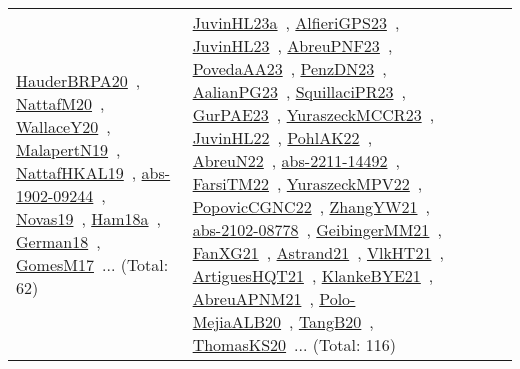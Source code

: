 {\begin{longtable}{lp{3cm}>{\raggedright\arraybackslash}p{6cm}>{\raggedright\arraybackslash}p{6cm}>{\raggedright\arraybackslash}p{8cm}}
\href{../works/HauderBRPA20.pdf}{HauderBRPA20}~\cite{HauderBRPA20}, \href{../works/NattafM20.pdf}{NattafM20}~\cite{NattafM20}, \href{../works/WallaceY20.pdf}{WallaceY20}~\cite{WallaceY20}, \href{../works/MalapertN19.pdf}{MalapertN19}~\cite{MalapertN19}, \href{../works/NattafHKAL19.pdf}{NattafHKAL19}~\cite{NattafHKAL19}, \href{../works/abs-1902-09244.pdf}{abs-1902-09244}~\cite{abs-1902-09244}, \href{../works/Novas19.pdf}{Novas19}~\cite{Novas19}, \href{../works/Ham18a.pdf}{Ham18a}~\cite{Ham18a}, \href{../works/German18.pdf}{German18}~\cite{German18}, \href{../works/GomesM17.pdf}{GomesM17}~\cite{GomesM17}... (Total: 62) & \href{../works/JuvinHL23a.pdf}{JuvinHL23a}~\cite{JuvinHL23a}, \href{../works/AlfieriGPS23.pdf}{AlfieriGPS23}~\cite{AlfieriGPS23}, \href{../works/JuvinHL23.pdf}{JuvinHL23}~\cite{JuvinHL23}, \href{../works/AbreuPNF23.pdf}{AbreuPNF23}~\cite{AbreuPNF23}, \href{../works/PovedaAA23.pdf}{PovedaAA23}~\cite{PovedaAA23}, \href{../works/PenzDN23.pdf}{PenzDN23}~\cite{PenzDN23}, \href{../works/AalianPG23.pdf}{AalianPG23}~\cite{AalianPG23}, \href{../works/SquillaciPR23.pdf}{SquillaciPR23}~\cite{SquillaciPR23}, \href{../works/GurPAE23.pdf}{GurPAE23}~\cite{GurPAE23}, \href{../works/YuraszeckMCCR23.pdf}{YuraszeckMCCR23}~\cite{YuraszeckMCCR23}, \href{../works/JuvinHL22.pdf}{JuvinHL22}~\cite{JuvinHL22}, \href{../works/PohlAK22.pdf}{PohlAK22}~\cite{PohlAK22}, \href{../works/AbreuN22.pdf}{AbreuN22}~\cite{AbreuN22}, \href{../works/abs-2211-14492.pdf}{abs-2211-14492}~\cite{abs-2211-14492}, \href{../works/FarsiTM22.pdf}{FarsiTM22}~\cite{FarsiTM22}, \href{../works/YuraszeckMPV22.pdf}{YuraszeckMPV22}~\cite{YuraszeckMPV22}, \href{../works/PopovicCGNC22.pdf}{PopovicCGNC22}~\cite{PopovicCGNC22}, \href{../works/ZhangYW21.pdf}{ZhangYW21}~\cite{ZhangYW21}, \href{../works/abs-2102-08778.pdf}{abs-2102-08778}~\cite{abs-2102-08778}, \href{../works/GeibingerMM21.pdf}{GeibingerMM21}~\cite{GeibingerMM21}, \href{../works/FanXG21.pdf}{FanXG21}~\cite{FanXG21}, \href{../works/Astrand21.pdf}{Astrand21}~\cite{Astrand21}, \href{../works/VlkHT21.pdf}{VlkHT21}~\cite{VlkHT21}, \href{../works/ArtiguesHQT21.pdf}{ArtiguesHQT21}~\cite{ArtiguesHQT21}, \href{../works/KlankeBYE21.pdf}{KlankeBYE21}~\cite{KlankeBYE21}, \href{../works/AbreuAPNM21.pdf}{AbreuAPNM21}~\cite{AbreuAPNM21}, \href{../works/Polo-MejiaALB20.pdf}{Polo-MejiaALB20}~\cite{Polo-MejiaALB20}, \href{../works/TangB20.pdf}{TangB20}~\cite{TangB20}, \href{../works/ThomasKS20.pdf}{ThomasKS20}~\cite{ThomasKS20}... (Total: 116)\\

\end{longtable}}

